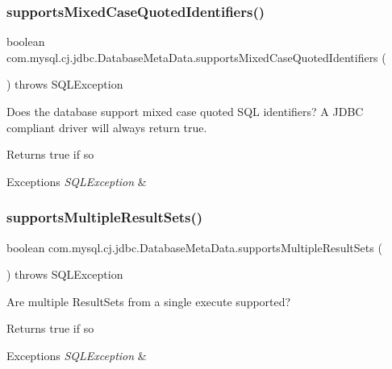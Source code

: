 \subsubsection{\texorpdfstring{supports\+Mixed\+Case\+Quoted\+Identifiers()}{supportsMixedCaseQuotedIdentifiers()}}
{\footnotesize\ttfamily boolean com.\+mysql.\+cj.\+jdbc.\+Database\+Meta\+Data.\+supports\+Mixed\+Case\+Quoted\+Identifiers (\begin{DoxyParamCaption}{ }\end{DoxyParamCaption}) throws S\+Q\+L\+Exception}

Does the database support mixed case quoted S\+QL identifiers? A J\+D\+BC compliant driver will always return true.

\begin{DoxyReturn}{Returns}
true if so 
\end{DoxyReturn}

\begin{DoxyExceptions}{Exceptions}
{\em S\+Q\+L\+Exception} & \\
\hline
\end{DoxyExceptions}
\mbox{\label{classcom_1_1mysql_1_1cj_1_1jdbc_1_1_database_meta_data_ac2598c637493e0cc7ca5f5cb1c1c464f}} 
\subsubsection{\texorpdfstring{supports\+Multiple\+Result\+Sets()}{supportsMultipleResultSets()}}
{\footnotesize\ttfamily boolean com.\+mysql.\+cj.\+jdbc.\+Database\+Meta\+Data.\+supports\+Multiple\+Result\+Sets (\begin{DoxyParamCaption}{ }\end{DoxyParamCaption}) throws S\+Q\+L\+Exception}

Are multiple Result\+Sets from a single execute supported?

\begin{DoxyReturn}{Returns}
true if so 
\end{DoxyReturn}

\begin{DoxyExceptions}{Exceptions}
{\em S\+Q\+L\+Exception} & \\
\hline
\end{DoxyExceptions}
\mbox{\label{classcom_1_1mysql_1_1cj_1_1jdbc_1_1_database_meta_data_a18865768002c7d7527f714e7ebf39f27}} 
